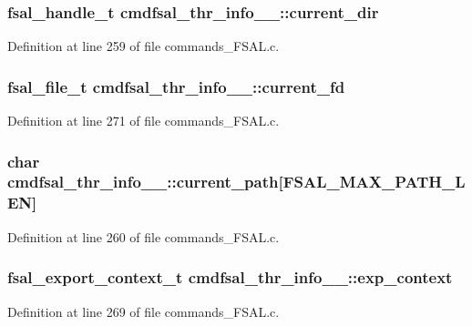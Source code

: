 \subsubsection[{current\_\-dir}]{\setlength{\rightskip}{0pt plus 5cm}fsal\_\-handle\_\-t {\bf cmdfsal\_\-thr\_\-info\_\-\_\-::current\_\-dir}}\label{structcmdfsal__thr__info_____a55cab2404e5c9bdf229b636dc0b2071a}


Definition at line 259 of file commands\_\-FSAL.c.
\subsubsection[{current\_\-fd}]{\setlength{\rightskip}{0pt plus 5cm}fsal\_\-file\_\-t {\bf cmdfsal\_\-thr\_\-info\_\-\_\-::current\_\-fd}}\label{structcmdfsal__thr__info_____aa33b996288139b99011f72aa56d832c6}


Definition at line 271 of file commands\_\-FSAL.c.
\subsubsection[{current\_\-path}]{\setlength{\rightskip}{0pt plus 5cm}char {\bf cmdfsal\_\-thr\_\-info\_\-\_\-::current\_\-path}[FSAL\_\-MAX\_\-PATH\_\-LEN]}\label{structcmdfsal__thr__info_____a9e3954e6a0053bc87c8aa39481ca4313}


Definition at line 260 of file commands\_\-FSAL.c.
\subsubsection[{exp\_\-context}]{\setlength{\rightskip}{0pt plus 5cm}fsal\_\-export\_\-context\_\-t {\bf cmdfsal\_\-thr\_\-info\_\-\_\-::exp\_\-context}}\label{structcmdfsal__thr__info_____a46c313f34b68fb57a05c80adcb178c64}


Definition at line 269 of file commands\_\-FSAL.c.
